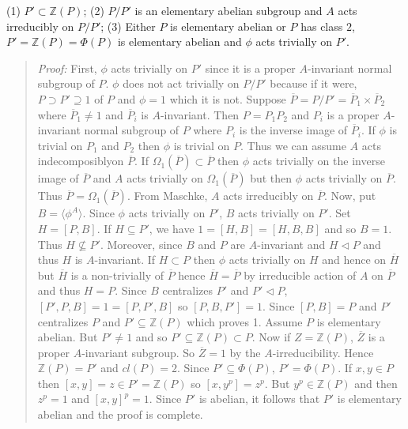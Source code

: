 (1) $P' \subset {\mathbb Z}(P)$;
(2) $P/P'$ is an elementary abelian subgroup and $A$ acts irreducibly on $P/P'$;
(3) Either $P$ is elementary abelian or $P$ has class $2$, $P' = {\mathbb Z}(P) = \Phi(P)$
is elementary abelian and $\phi$ acts trivially on $P'$.
\begin{quote}
\emph{Proof:}  
First, $\phi$ acts trivially on $P'$ since it is a proper $A$-invariant normal
subgroup of $P$.  $\phi$ does not act trivially on $P/P'$ because if it were,
$P \supset P' \supseteq 1$ of $P$ and $\phi= 1$ which it is not.
Suppose ${\overline P}= P/P' = {\overline P}_1 \times {\overline P}_2$ where
${\overline P}_1 \ne 1$ and
${\overline P}_i$ is $A$-invariant.  Then $P= P_1 P_2$ and $P_i$ is a proper
$A$-invariant normal subgroup of $P$ where $P_i$ is the inverse image of ${\overline P}_i$.
If $\phi$ is trivial on $P_1$ and $P_2$ then $\phi$ is trivial on $P$.
Thus we can assume $A$ acts indecomposiblyon ${\overline P}$.
If $\Omega_1({\overline P}) \subset {\overline P}$ then $\phi$ acts trivially on the
inverse image of ${\overline P}$ and $A$ acts trivially on
$\Omega_1({\overline P})$ but then $\phi$ acts trivially on ${\overline P}$.
Thus ${\overline P} = \Omega_1({\overline P})$.  From Maschke, $A$ acts irreducibly on
${\overline P}$.  Now, put $B= \langle \phi^A \rangle$.  Since $\phi$ acts trivially
on $P'$, $B$ acts trivially on $P'$.  Set $H= [P, B]$.  If $H \subseteq P'$, we have
$1 = [H,B]= [H, B, B]$ and so $B=1$.  Thus $H \nsubseteq P'$.
Moreover, since $B$ and $P$ are $A$-invariant and $H \lhd P$ and thus $H$ is $A$-invariant.
If $H \subset P$ then $\phi$ acts trivially on $H$ and hence on 
${\overline H}$ but ${\overline H}$ is a non-trivially of ${\overline P}$
hence ${\overline H} = {\overline P}$ by irreducible action of $A$ on ${\overline P}$ and
thus $H = P$.  Since $B$ centralizes $P'$ and $P' \lhd P$, $[P',P,B] = 1 = [P, P', B]$
so $[P, B, P'] = 1$.  Since $[P, B] = P$ and $P'$ centralizes $P$ 
and $P' \subseteq {\mathbb Z}(P)$ which proves 1.
Assume $P$ is elementary abelian.  But $P' \ne 1$ and so $P' \subseteq {\mathbb Z}(P) \subset P$.
Now if $Z= {\mathbb Z}(P)$, ${\overline Z}$ is a proper $A$-invariant subgroup.  So
${\overline Z} = 1$ by the $A$-irreducibility.  Hence ${\mathbb Z}(P) = P'$ and
$cl(P)=2$.  Since $P' \subseteq \Phi(P)$, $P' = \Phi(P)$.
If $x, y \in P$ then $[x, y]= z \in  P'= {\mathbb Z}(P)$  so $[x,y^p]= z^p$.  But
$y^p \in {\mathbb Z}(P)$ and then $z^p= 1$ and $[x,y]^p= 1$.  Since $P'$ is abelian,
it follows that $P'$ is elementary abelian and the proof is complete.
\end{quote}

